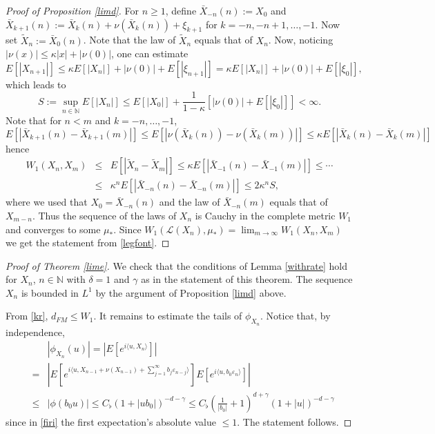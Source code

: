 \documentclass{article}
\begin{document}
\begin{proof}[Proof of Proposition \ref{limd}]
For $n\geq 1$, define $\bar{X}_{-n}(n):=X_{0}$ and $\bar{X}_{k+1}(n):=\bar{X}_{k}(n)+\nu(\bar{X}_{k}(n))+\xi_{k+1}$
for $k=-n,-n+1,\ldots,-1$. Now set $\tilde{X}_{n}:=\bar{X}_{0}(n)$. Note that the law of $\tilde{X}_{n}$ equals
that of $X_{n}$. 
Now, noticing $|\nu(x)|\leq \kappa |x|+|\nu(0)|$, one can estimate
$$
E[|X_{n+1}|]\leq \kappa E[|X_{n}|]+|\nu(0)|+E[|\xi_{n+1}|]=\kappa E[|X_{n}|]+|\nu(0)|+E[|\xi_{0}|],
$$
which leads to
$$
S:=\sup_{n\in\mathbb{N}}E[|X_{n}|]\leq E[|X_{0}|]+\frac{1}{1-\kappa}[|\nu(0)|+E[|\xi_{0}|]]<\infty.
$$
Note that for $n<m$ and $k=-n,\ldots,-1$,
$$
E[|\bar{X}_{k+1}(n)-\bar{X}_{k+1}(m)|]\leq E[|\nu(\bar{X}_{k}(n))-\nu(\bar{X}_{k}(m))|]\leq 
\kappa E[|\bar{X}_{k}(n)-\bar{X}_{k}(m)|]
$$
hence
\begin{eqnarray} \nonumber
W_{1}(X_{n},X_{m}) &\leq& E[|\tilde{X}_{n}-\tilde{X}_{m}|]\leq \kappa E[|\bar{X}_{-1}(n)-\bar{X}_{-1}(m)|]
\leq \cdots\\ 
\label{legfont} &\leq&{}
\kappa^{n}E[|\bar{X}_{-n}(n)-\bar{X}_{-n}(m)|]\leq 2\kappa^{n}S,
\end{eqnarray}
where we used that $X_{0}=\bar{X}_{-n}(n)$ and the law of $\bar{X}_{-n}(m)$ 
equals that of $X_{m-n}$.
Thus the sequence of the laws of ${X}_{n}$ is Cauchy in the complete metric $W_{1}$
and converges to some $\mu_{*}$. Since $W_{1}(\mathcal{L}({X}_{n}),\mu_{*})=\lim_{m\to\infty}W_{1}(X_{n},X_{m})$
we get the statement from \eqref{legfont}.
\end{proof}

\begin{proof}[Proof of Theorem \ref{lime}]
We check that the conditions of Lemma \ref{withrate} hold for $X_{n}$, $n\in\mathbb{N}$
with $\delta=1$ and $\gamma$ as in the statement of this theorem. The sequence
$X_{n}$ is bounded in $L^{1}$ by the argument of Proposition \ref{limd} above. 

From \eqref{kr}, $d_{FM}\leq W_{1}$. It remains to
estimate the tails of $\phi_{X_{n}}$. Notice that, by independence,
\begin{eqnarray}\nonumber
& & |\phi_{X_{n}}(u)|=|E[e^{i\langle u,X_{n}\rangle}]|\\
&=& \label{firi} |E[e^{i\langle u,X_{n-1}+\nu(X_{n-1})+\sum_{j=1}^{\infty}b_{j}\varepsilon_{n-j}\rangle}]
E[e^{i\langle u,b_{0}\varepsilon_{n}\rangle}]|\\
&\leq& \nonumber |\phi(b_{0}u)|\leq C_{\flat}(1+|u b_{0}|)^{-d-\gamma}\leq C_{\flat}\left(\frac{1}{|b_{0}|}+1
\right)^{d+\gamma}(1+|u|)^{-d-\gamma}	
\end{eqnarray}
since in \eqref{firi} the first expectation's absolute value $\leq 1$. The statement follows.  
\end{proof}
\end{document}
